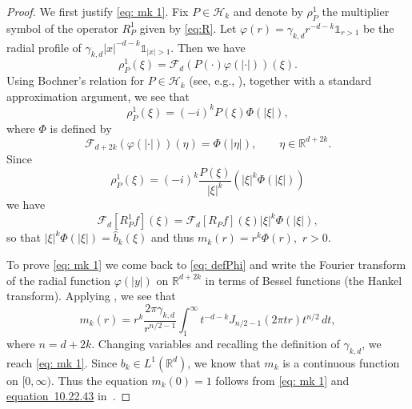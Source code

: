 \documentclass[10pt,a4paper]{amsart}
\newcommand{\R}{\mathbb{R}}
\newcommand{\abs}[1]{\left\lvert #1 \right\rvert}
\newcommand{\ind}{\mathbb{1}}
\newcommand{\mF}{\mathcal{F}}
\newcommand{\mH}{\mathcal{H}}
\begin{document}
\begin{proof}
We first justify \eqref{eq: mk 1}. Fix $P\in \mH_k$ and denote by $\rho_P^1$ the multiplier symbol of the operator $R_P^1$ given by \eqref{eq:R}. Let $\varphi(r) = \gamma_{k,d}r^{-d-k}\ind_{r > 1}$ be the radial profile of $\gamma_{k,d}|x|^{-d-k}\ind{_{|x|>1}}$. Then we have
\[
\rho_P^1(\xi)=\mF_{d}(P(\cdot)\varphi(|\cdot|))(\xi).
\]
 Using Bochner's relation for $P\in \mH_k$ (see, e.g., \cite[Corollary p.72]{stein}), together with a standard approximation argument, we see that
\[
\rho_P^1(\xi)=(-i)^k P(\xi)\Phi(\abs{\xi}),
\]
where $\Phi$ is defined by
\begin{equation}
\label{eq: defPhi}
\mF_{d+2k}(\varphi(|\cdot|))(\eta)=\Phi(|\eta|),\qquad \eta\in \R^{d+2k}.
\end{equation}
Since 
\[
\rho_P^1(\xi)=(-i)^k \frac{P(\xi)}{|\xi|^k}(|\xi|^k\Phi(\abs{\xi}))
\]
we have
\[
\mF_d[R_P^1 f](\xi)=\mF_d[R_P f](\xi)|\xi|^k\Phi(\abs{\xi}),
\]
so that
$|\xi|^k\Phi(
\abs{\xi})=\widehat{b}_k(\xi)$ and thus $m_k(r)=r^k\Phi(r),$ $r>0.$

To prove \eqref{eq: mk 1} we come back to \eqref{eq: defPhi} and write the Fourier transform of the radial function $\varphi(|y|)$ on $\R^{d+2k}$ in terms of Bessel functions (the Hankel transform). Applying \cite[Section B.5]{grafakos}, we see that
\[
 m_k(r) = r^k\frac{2\pi \gamma_{k,d}}{r^{n/2-1}} \int_1^\infty t^{-d-k} J_{n/2 - 1}(2\pi tr) t^{n/2} \, dt, 
\]
where $n=d+2k.$ Changing variables and recalling the definition of $\gamma_{k,d}$, we reach \eqref{eq: mk 1}. Since $b_k\in L^1(\R^d)$, we know that  $m_k$ is a continuous function on $[0,\infty).$ Thus the equation $m_k(0)=1$ follows from \eqref{eq: mk 1} and \href{https://dlmf.nist.gov/10.22.E43}{equation~10.22.43} in~\cite{dlmf}. 


\end{proof}
\end{document}
